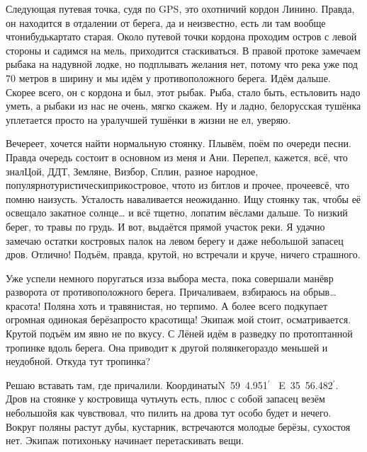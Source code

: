 Следующая путевая точка, судя по GPS, это охотничий кордон Линино. Правда, он находится в отдалении от берега, да и неизвестно, есть ли там вообще что\sdash нибудь\mdash карта\sdash то старая. Около путевой точки кордона проходим остров с левой стороны и садимся на мель, приходится стаскиваться. В правой протоке замечаем рыбака на надувной лодке, но подплывать желания нет, потому что река уже под 70 метров в ширину и мы идём у противоположного берега. Идём дальше. Скорее всего, он с кордона и был, этот рыбак. Рыба, стало быть, есть\mdash ловить надо уметь, а рыбаки из нас не очень, мягко скажем. Ну и ладно, белорусская тушёнка уплетается просто на ура\mdash лучшей тушёнки в жизни не ел, уверяю.

Вечереет, хочется найти нормальную стоянку. Плывём, поём по очереди песни. Правда очередь состоит в основном из меня и Ани. Перепел, кажется, всё, что знал\mdash Цой, ДДТ, Земляне, Визбор, Сплин, разное народное, популярно\sdash туристически\sdash прикостровое, что\sdash то из битлов и прочее, прочее\mdash всё, что помню наизусть. Усталость наваливается неожиданно. Ищу стоянку так, чтобы её освещало закатное солнце… и всё тщетно, лопатим вёслами дальше. То низкий берег, то травы по грудь. И вот, выдаётся прямой участок реки. Я удачно замечаю остатки костровых палок на левом берегу и даже небольшой запасец дров. Отлично! Подъём, правда, крутой, но встречали и круче, ничего страшного.

Уже успели немного поругаться из\sdash за выбора места, пока совершали манёвр разворота от противоположного берега. Причаливаем, взбираюсь на обрыв… красота! Поляна хоть и травянистая, но терпимо. А более всего подкупает огромная одинокая берёза\mdash просто красотища! Экипаж мой стоит, осматривается. Крутой подъём им явно не по вкусу. С Лёней идём в разведку по протоптанной тропинке вдоль берега. Она приводит к другой полянке\mdash гораздо меньшей и неудобной. Откуда тут тропинка? 

Решаю вставать там, где причалили. Координаты\mdash N~59\degree~4.951$^\prime$~ E~35\degree~56.482$^\prime$. Дров на стоянке у костровища чуть\sdash чуть есть, плюс с собой запасец везём небольшой\mdash я как чувствовал, что пилить на дрова тут особо будет и нечего. Вокруг поляны растут дубы, кустарник, встречаются молодые берёзы, сухостоя нет. Экипаж потихоньку начинает перетаскивать вещи. 

